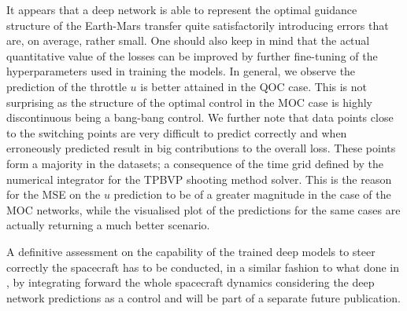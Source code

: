 \documentclass[graybox]{svmult}
\begin{document}
It appears that a deep network is able to represent the optimal guidance structure of the Earth-Mars transfer quite satisfactorily introducing errors that are, on average, rather small. 
One should also keep in mind that the actual quantitative value of the losses can be improved by further fine-tuning of the hyperparameters used in training the models.
In general, we observe the prediction of the throttle $u$ is better attained in the QOC case.
This is not surprising as the structure of the optimal control in the MOC case is highly discontinuous being a  bang-bang control.
We further note that data points close to the switching points are very difficult to predict correctly and when erroneously predicted result in big contributions to the overall loss.
These points form a majority in the datasets; a consequence of the time grid defined by the numerical integrator for the TPBVP shooting method solver.
This is the reason for the MSE on the $u$ prediction to be of a greater magnitude in the case of the MOC networks, while the visualised plot of the predictions for the same cases are actually returning a much better scenario.

% 

A definitive assessment on the capability of the trained deep models to steer correctly the spacecraft has to be conducted, in a similar fashion to what done in \cite{sanchez2016real}, by integrating forward the whole spacecraft dynamics considering the deep network predictions as a control and will be part of a separate future publication.




\end{document}
